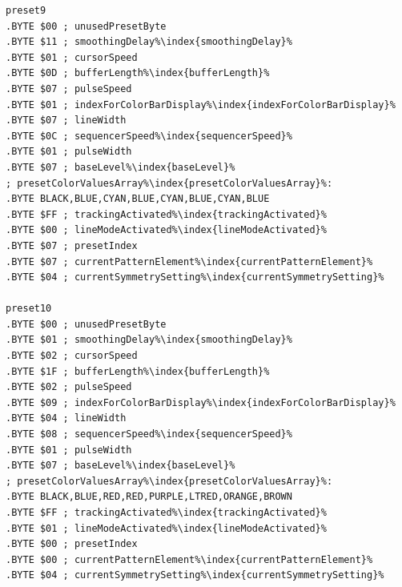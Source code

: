 \begin{minipage}[b]{0.33\linewidth}
\begin{lrbox}{\mybox}
\begin{lstlisting}[basicstyle=\ttfamily\tiny,escapechar=\%]
preset9
.BYTE $00 ; unusedPresetByte
.BYTE $11 ; smoothingDelay%\index{smoothingDelay}%
.BYTE $01 ; cursorSpeed
.BYTE $0D ; bufferLength%\index{bufferLength}%
.BYTE $07 ; pulseSpeed
.BYTE $01 ; indexForColorBarDisplay%\index{indexForColorBarDisplay}%
.BYTE $07 ; lineWidth
.BYTE $0C ; sequencerSpeed%\index{sequencerSpeed}%
.BYTE $01 ; pulseWidth
.BYTE $07 ; baseLevel%\index{baseLevel}%
; presetColorValuesArray%\index{presetColorValuesArray}%: 
.BYTE BLACK,BLUE,CYAN,BLUE,CYAN,BLUE,CYAN,BLUE
.BYTE $FF ; trackingActivated%\index{trackingActivated}%
.BYTE $00 ; lineModeActivated%\index{lineModeActivated}%
.BYTE $07 ; presetIndex
.BYTE $07 ; currentPatternElement%\index{currentPatternElement}%
.BYTE $04 ; currentSymmetrySetting%\index{currentSymmetrySetting}%

preset10
.BYTE $00 ; unusedPresetByte
.BYTE $01 ; smoothingDelay%\index{smoothingDelay}%
.BYTE $02 ; cursorSpeed
.BYTE $1F ; bufferLength%\index{bufferLength}%
.BYTE $02 ; pulseSpeed
.BYTE $09 ; indexForColorBarDisplay%\index{indexForColorBarDisplay}%
.BYTE $04 ; lineWidth
.BYTE $08 ; sequencerSpeed%\index{sequencerSpeed}%
.BYTE $01 ; pulseWidth
.BYTE $07 ; baseLevel%\index{baseLevel}%
; presetColorValuesArray%\index{presetColorValuesArray}%: 
.BYTE BLACK,BLUE,RED,RED,PURPLE,LTRED,ORANGE,BROWN
.BYTE $FF ; trackingActivated%\index{trackingActivated}%
.BYTE $01 ; lineModeActivated%\index{lineModeActivated}%
.BYTE $00 ; presetIndex
.BYTE $00 ; currentPatternElement%\index{currentPatternElement}%
.BYTE $04 ; currentSymmetrySetting%\index{currentSymmetrySetting}%

\end{lstlisting}
\end{lrbox}%
\scalebox{0.8}{\usebox{\mybox}}
\end{minipage}
